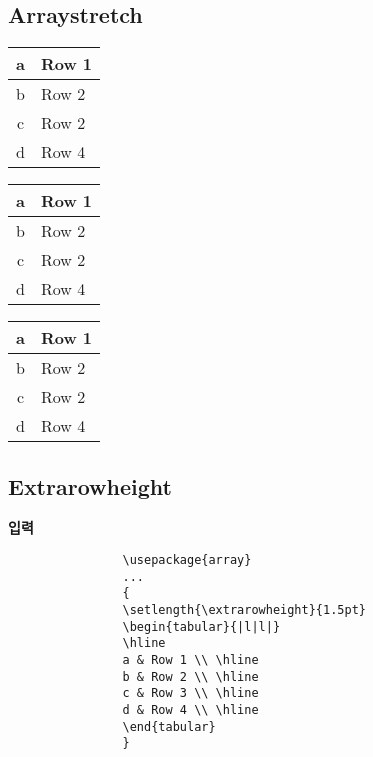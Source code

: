 \documentclass[12pt,a4paper]{report}
\begin{document}
	\subsection{Arraystretch}
		{
		\renewcommand{\arraystretch}{1.0}
		\begin{tabular}{|c|l|}
		\hline
		a & Row 1 \\ \hline
		b & Row 2 \\ \hline
		c & Row 2 \\ \hline
		d & Row 4 \\ \hline
		\end{tabular}
		}
		{
		\renewcommand{\arraystretch}{1.2}
		\begin{tabular}{|c|l|}
		\hline
		a & Row 1 \\ \hline
		b & Row 2 \\ \hline
		c & Row 2 \\ \hline
		d & Row 4 \\ \hline
		\end{tabular}
		}
		{
		\renewcommand{\arraystretch}{2.0}
		\begin{tabular}{|c|l|}
		\hline
		a & Row 1 \\ \hline
		b & Row 2 \\ \hline
		c & Row 2 \\ \hline
		d & Row 4 \\ \hline
		\end{tabular}
		}
		
	\clearpage %
	\subsection{Extrarowheight}
	

		\textbf{입력}
		\singlespacing
			\begin{boxedminipage}[t]{1.0\linewidth}
			\begin{verbatim}
				\usepackage{array}
				...
				{
				\setlength{\extrarowheight}{1.5pt}
				\begin{tabular}{|l|l|}
				\hline
				a & Row 1 \\ \hline
				b & Row 2 \\ \hline
				c & Row 3 \\ \hline
				d & Row 4 \\ \hline
				\end{tabular}
				}
			\end{verbatim} 
			\end{boxedminipage} \\ \\
		\doublespacing
\end{document}
